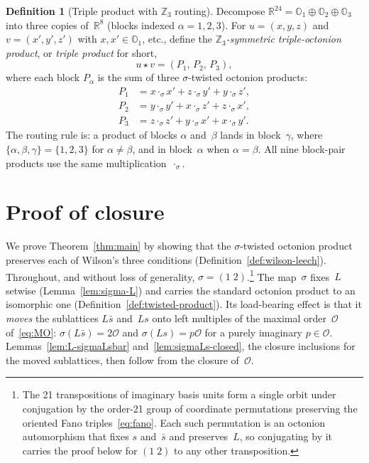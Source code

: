 \documentclass[twoside,english]{paper}
\numberwithin{equation}{section}
\numberwithin{figure}{section}
\theoremstyle{definition}
\newtheorem{definition}[theorem]{Definition}
\theoremstyle{remark}
\newcommand{\OO}{\mathbb{O}}          %
\newcommand{\MO}{\mathcal{O}}         %
\newcommand{\RR}{\mathbb{R}}
\newcommand{\ZZ}{\mathbb{Z}}
\begin{document}
\begin{definition}[Triple product with $\ZZ_3$ routing]
\label{def:triple}
Decompose $\RR^{24} = \OO_1 \oplus \OO_2 \oplus \OO_3$ into three
copies of~$\RR^8$ (blocks indexed $\alpha = 1, 2, 3$).  For
$u = (x, y, z)$ and $v = (x', y', z')$ with $x, x' \in \OO_1$, etc.,
define the \emph{$\ZZ_3$-symmetric triple-octonion product}, or
\emph{triple product} for short,
\begin{equation}\label{eq:triple}
  u \star v = (P_1,\, P_2,\, P_3),
\end{equation}
where each block $P_\alpha$ is the sum of three $\sigma$-twisted
octonion products:
\begin{align}
  P_1 &= x \cdot_\sigma x' + z \cdot_\sigma y' + y \cdot_\sigma z',
  \label{eq:P1} \\
  P_2 &= y \cdot_\sigma y' + x \cdot_\sigma z' + z \cdot_\sigma x',
  \label{eq:P2} \\
  P_3 &= z \cdot_\sigma z' + y \cdot_\sigma x' + x \cdot_\sigma y'.
  \label{eq:P3}
\end{align}
The routing rule is: a product of blocks $\alpha$ and~$\beta$ lands in
block~$\gamma$, where $\{\alpha, \beta, \gamma\} = \{1,2,3\}$ for
$\alpha \ne \beta$, and in block~$\alpha$ when $\alpha = \beta$.
All nine block-pair products use the same multiplication~$\cdot_\sigma$.
\end{definition}

\section{Proof of closure}\label{sec:proof}

We prove Theorem~\ref{thm:main} by showing that the $\sigma$-twisted
octonion product preserves each of Wilson's three conditions
(Definition~\ref{def:wilson-leech}).  Throughout, and without loss of
generality, $\sigma = (1\;2)$.\footnote{The 21 transpositions of
imaginary basis units form a single orbit under conjugation by the
order-21 group of coordinate permutations preserving the oriented Fano
triples~\eqref{eq:fano}.  Each such permutation is an octonion
automorphism that fixes $s$ and~$\bar s$ and preserves~$L$, so
conjugating by it carries the proof below for $(1\;2)$ to any other
transposition.}  The map~$\sigma$ fixes~$L$ setwise
(Lemma~\ref{lem:sigma-L}) and carries the standard octonion product to
an isomorphic one (Definition~\ref{def:twisted-product}).  Its
load-bearing effect is that it \emph{moves} the sublattices $L\bar s$
and~$Ls$ onto left multiples of the maximal order~$\MO$
of~\eqref{eq:MO}: $\sigma(L\bar s) = 2\MO$ and $\sigma(Ls) = p\MO$ for a
purely imaginary $p \in \MO$.  Lemmas~\ref{lem:L-sigmaLsbar}
and~\ref{lem:sigmaLs-closed}, the closure inclusions for the moved
sublattices, then follow from the closure of~$\MO$.
\end{document}
